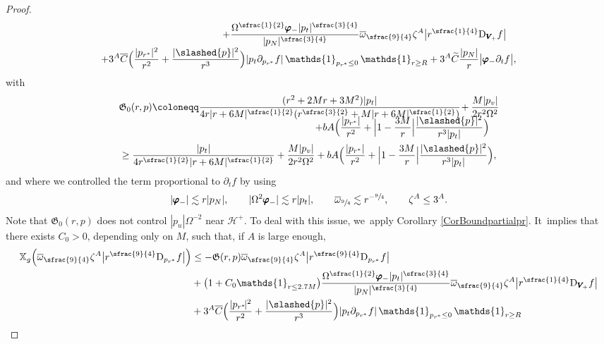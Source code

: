 \documentclass[10pt]{amsart}
\theoremstyle{plain}
\theoremstyle{definition}
\newcommand\z{{\zeta}}
\newcommand\T{{\mathbb{X}}}
\renewcommand\H{{\mathcal{H}^+}}
\begin{document}
\begin{proof}
\begin{multline*}
\shoveright{+ \frac{\Omega^{\sfrac{1}{2}}\pmb{\varphi}_- |p_t|^{\sfrac{3}{4}}}{|p_N|^{\sfrac{3}{4}}} \overline{\omega}_{\sfrac{9}{4}} \z^A \big| r^{\sfrac{1}{4}} \mathrm{D}_{\pmb{V}_{\! +}} f \big|}\\[-3pt]
 +3^A\overline{C} \Bigl(\frac{|p_{r^*}|^2}{r^2 }+ \frac{|\slashed{p}|^2}{r^3 } \Bigr) |p_t \partial_{p_{r^*}} f| \, \mathds{1}_{p_{r^*} \leq 0} \, \mathds{1}_{r \geq R} +3^A \widetilde{C}\frac{|p_N|}{ r} \big| \pmb{\varphi}_- \partial_t f \big|,
\end{multline*}
with\vspace*{-5pt}
\begin{multline*}
\mathfrak{G}_0(r,p) \coloneqq \frac{(r^2+2Mr+3M^2)|p_t|}{4r|r+6M|^{\sfrac{1}{2}}(r^{\sfrac{3}{2}}+M|r+6M|^{\sfrac{1}{2}}) } \! +\frac{M|p_v|}{2r^2 \Omega^2} \\[-8pt]
\shoveright{+ bA \Bigl(\frac{|p_{r^*}|}{r^2}+ \Bigl |1-\frac{3M}{r} \Bigr| \frac{|\slashed{p}|^2}{r^3|p_t|} \Bigr)}\\
\geq \frac{|p_t|}{4r^{\sfrac{1}{2}}|r+6M|^{\sfrac{1}{2}} }+\frac{M|p_v|}{2r^2 \Omega^2} + bA \Bigl(\frac{|p_{r^*}|}{r^2}+ \Bigl |1-\frac{3M}{r} \Bigr| \frac{|\slashed{p}|^2}{r^3|p_t|} \Bigr),
\end{multline*}
and where we controlled the term proportional to $\partial_t f$ by using\vspace*{-3pt}
\[
|\pmb{\varphi}_-| \lesssim r|p_N|, \qquad |\Omega^2 \pmb{\varphi}_-| \lesssim r |p_t|, \qquad \overline{\omega}_{\sfrac{9}{4}} \lesssim r^{-\sfrac{9}{4}}, \qquad \z^A \leq 3^A.
\]
Note that $\mathfrak{G}_0(r,p)$ does not control $|p_u| \Omega^{-2}$ near $\H$. To deal with this issue, we~apply Corollary \ref{CorBoundpartialpr}. It~implies that there exists $C_0 >0$, depending only on $M$, such that, if $A$ is large enough,\vspace*{-5pt}
\begin{align*}
\T_g \Bigl(\overline{\omega}_{\sfrac{9}{4}} \z^A \big| r^{\sfrac{9}{4}} \mathrm{D }_{p_{r^*}} f \big| \Bigr) &\leq - \mathfrak{G}(r,p) \overline{\omega}_{\sfrac{9}{4}} \z^A \big| r^{\sfrac{9}{4}} \mathrm{D }_{p_{r^*}} f \big| \\
& +\bigl(1+ C_0 \mathds{1}_{r \leq 2.7M} \bigr) \frac{\Omega^{\sfrac{1}{2}}\pmb{\varphi}_- |p_t|^{\sfrac{3}{4}}}{|p_N|^{\sfrac{3}{4}}} \overline{\omega}_{\sfrac{9}{4}} \z^A \big| r^{\sfrac{1}{4}} \mathrm{D}_{\pmb{V}_{\! +}} f \big| \\
&+ 3^A\overline{C} \Bigl(\frac{|p_{r^*}\!|^2}{r^2 }+ \frac{|\slashed{p}|^2}{r^3 } \Bigr) |p_t \partial_{p_{r^*}} f| \, \mathds{1}_{p_{r^*} \leq 0} \, \mathds{1}_{r \geq R} \\

\end{align*}
\end{proof}
\end{document}
